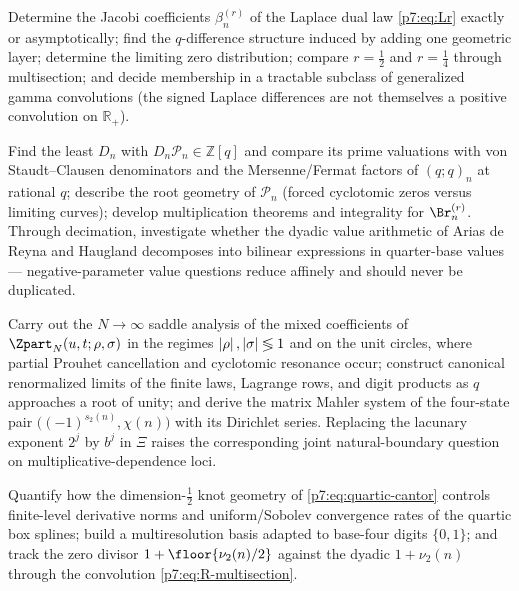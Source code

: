 \documentclass[11pt,oneside]{article}
\numberwithin{equation}{section}
\theoremstyle{definition}
\theoremstyle{remark}
\newcommand{\R}{\mathbb R}
\newcommand{\Z}{\mathbb Z}
\newcommand{\vtwo}{\nu_2}
\newcommand{\wt}{s_2}
\begin{document}
\begin{problem}
Determine the Jacobi coefficients $\beta_n^{(r)}$ of the Laplace dual law
\eqref{p7:eq:Lr} exactly or asymptotically; find the $q$-difference structure
induced by adding one geometric layer; determine the limiting zero
distribution; compare $r=\tfrac12$ and $r=\tfrac14$ through multisection;
and decide membership in a tractable subclass of generalized gamma
convolutions (the signed Laplace differences are not themselves a positive
convolution on $\R_+$).
\end{problem}

\begin{problem}
Find the least $D_n$ with $D_n\mathcal P_n\in\Z[q]$ and compare its prime
valuations with von Staudt--Clausen denominators and the Mersenne/Fermat
factors of $(q;q)_n$ at rational $q$; describe the root geometry of
$\mathcal P_n$ (forced cyclotomic zeros versus limiting curves); develop
multiplication theorems and integrality for $\Br_n^{(r)}$.  Through
decimation, investigate whether the dyadic value arithmetic of Arias de
Reyna and Haugland decomposes into bilinear expressions in quarter-base
values --- negative-parameter value questions reduce affinely and should
never be duplicated.
\end{problem}

\begin{problem}
Carry out the $N\to\infty$ saddle analysis of the mixed coefficients of
$\Zpart_N(u,t;\rho,\sigma)$ in the regimes $\left\lvert \rho\right\rvert,\left\lvert \sigma\right\rvert\lessgtr1$ and
on the unit circles, where partial Prouhet cancellation and cyclotomic
resonance occur; construct canonical renormalized limits of the finite laws,
Lagrange rows, and digit products as $q$ approaches a root of unity; and
derive the matrix Mahler system of the four-state pair
$\bigl((-1)^{\wt(n)},\chi(n)\bigr)$ with its Dirichlet series.  Replacing the
lacunary exponent $2^j$ by $b^j$ in $\Xi$ raises the corresponding
joint natural-boundary question on multiplicative-dependence loci.
\end{problem}

\begin{problem}
Quantify how the dimension-$\tfrac12$ knot geometry of
\eqref{p7:eq:quartic-cantor} controls finite-level derivative norms and
uniform/Sobolev convergence rates of the quartic box splines; build a
multiresolution basis adapted to base-four digits $\{0,1\}$; and track the
zero divisor $1+\floor{\vtwo(n)/2}$ against the dyadic $1+\vtwo(n)$ through
the convolution \eqref{p7:eq:R-multisection}.
\end{problem}
\end{document}
